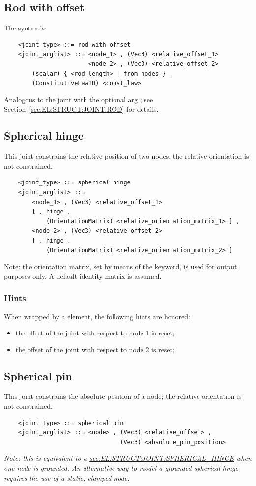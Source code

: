 \subsection{Rod with offset}
\label{sec:EL:STRUCT:JOINT:ROD_WITH_OFFSET}
The syntax is:
\begin{verbatim}
    <joint_type> ::= rod with offset
    <joint_arglist> ::= <node_1> , (Vec3) <relative_offset_1>
                        <node_2> , (Vec3) <relative_offset_2>
        (scalar) { <rod_length> | from nodes } ,
        (ConstitutiveLaw1D) <const_law>
\end{verbatim}
Analogous to the  joint with the optional arg ;
see Section~\ref{sec:EL:STRUCT:JOINT:ROD} for details.



\subsection{Spherical hinge}
\label{sec:EL:STRUCT:JOINT:SPHERICAL_HINGE}
This joint constrains the relative position of two nodes;
the relative orientation is not constrained.
\begin{verbatim}
    <joint_type> ::= spherical hinge
    <joint_arglist> ::= 
        <node_1> , (Vec3) <relative_offset_1> 
        [ , hinge , 
            (OrientationMatrix) <relative_orientation_matrix_1> ] ,
        <node_2> , (Vec3) <relative_offset_2>
        [ , hinge , 
            (OrientationMatrix) <relative_orientation_matrix_2> ]
\end{verbatim}
Note: the orientation matrix, set by means of the  keyword,
is used for output purposes only. 
A default identity matrix is assumed.

\subsubsection{Hints}
When wrapped by a  element, the following hints are honored:
\begin{itemize}
\item {} the offset of the joint
with respect to node 1 is reset;
\item {} the offset of the joint
with respect to node 2 is reset;
\end{itemize}

\subsection{Spherical pin}
This joint constrains the absolute position of a node;
the relative orientation is not constrained.
\begin{verbatim}
    <joint_type> ::= spherical pin
    <joint_arglist> ::= <node> , (Vec3) <relative_offset> ,
                                 (Vec3) <absolute_pin_position>
\end{verbatim}
{\em
	Note: this is equivalent to a
	\hyperref{\kw{spherical hinge}}{\kw{spherical hinge} (see Section~}{)}{sec:EL:STRUCT:JOINT:SPHERICAL_HINGE}
	when one node is grounded.
	An alternative way to model a grounded spherical hinge requires
	the use of a static, clamped node.
}

